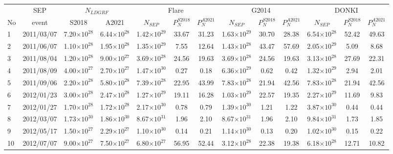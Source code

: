 \documentclass{aastex61}
\begin{document}
\begin{table}[!t]
\center
\scriptsize
\setlength{\tabcolsep}{2.5pt}
\begin{tabular}{l|c|cc|ccc|ccc|ccc|}
& SEP & \multicolumn{2}{c|}{$N_{LDGRF}$} & \multicolumn{3}{c|}{Flare} & \multicolumn{3}{c|}{G2014} & \multicolumn{3}{c|}{DONKI} \\
No & event & S2018 & A2021 & $N_{SEP}$ & $P_{N}^{S2018}$ & $P_{N}^{A2021}$ & $N_{SEP}$ & $P_{N}^{S2018}$ & $P_{N}^{A2021}$ & $N_{SEP}$ & $P_{N}^{S2018}$ & $P_{N}^{A2021}$  \\
\hline
1 & 2011/03/07 & 7.20$\times10^{28}$ & 6.44$\times10^{28}$ & 1.42$\times10^{29}$ & 33.67 & 31.23 & 1.63$\times10^{29}$ & 30.70 & 28.38 & 6.54$\times10^{28}$ & 52.42 & 49.63 \\ 
2 & 2011/06/07 & 1.10$\times10^{28}$ & 1.95$\times10^{28}$ & 1.35$\times10^{29}$ & 7.55 & 12.64 & 1.43$\times10^{28}$ & 43.47 & 57.69 & 2.05$\times10^{29}$ & 5.09 & 8.68 \\ 
3 & 2011/08/04 & 1.20$\times10^{28}$ & 9.00$\times10^{27}$ & 3.69$\times10^{28}$ & 24.56 & 19.63 & 3.69$\times10^{28}$ & 24.56 & 19.63 & 3.13$\times10^{28}$ & 27.69 & 22.31 \\ 
4 & 2011/08/09 & 4.00$\times10^{27}$ & 2.70$\times10^{27}$ & 1.47$\times10^{30}$ & 0.27 & 0.18 & 6.36$\times10^{29}$ & 0.62 & 0.42 & 1.32$\times10^{29}$ & 2.94 & 2.01 \\ 
5 & 2011/09/06 & 2.20$\times10^{28}$ & 5.80$\times10^{28}$ & 7.39$\times10^{28}$ & 22.95 & 43.99 & 7.83$\times10^{28}$ & 21.94 & 42.56 & 7.83$\times10^{28}$ & 21.94 & 42.56 \\ 
6 & 2012/01/23 & 3.00$\times10^{28}$ & 2.47$\times10^{28}$ & 1.27$\times10^{29}$ & 19.11 & 16.28 & 1.03$\times10^{29}$ & 22.57 & 19.35 & 2.27$\times10^{29}$ & 11.69 & 9.83 \\ 
7 & 2012/01/27 & 1.70$\times10^{28}$ & 1.72$\times10^{28}$ & 2.17$\times10^{30}$ & 0.78 & 0.79 & 1.39$\times10^{30}$ & 1.21 & 1.22 & 3.87$\times10^{30}$ & 0.44 & 0.44 \\ 
8 & 2012/03/07 & 1.73$\times10^{30}$ & 1.86$\times10^{30}$ & 8.67$\times10^{31}$ & 1.96 & 2.10 & 8.67$\times10^{31}$ & 1.96 & 2.10 & 9.84$\times10^{31}$ & 1.73 & 1.85 \\ 
9 & 2012/05/17 & 1.50$\times10^{27}$ & 2.29$\times10^{27}$ & 1.10$\times10^{30}$ & 0.14 & 0.21 & 1.14$\times10^{30}$ & 0.13 & 0.20 & 1.02$\times10^{30}$ & 0.15 & 0.22 \\ 
10 & 2012/07/07 & 9.00$\times10^{27}$ & 7.50$\times10^{27}$ & 6.80$\times10^{27}$ & 56.95 & 52.44 & 3.12$\times10^{28}$ & 22.38 & 19.38 & 6.18$\times10^{28}$ & 12.71 & 10.82 \\ 

\end{tabular}
\end{table}
\end{document}
